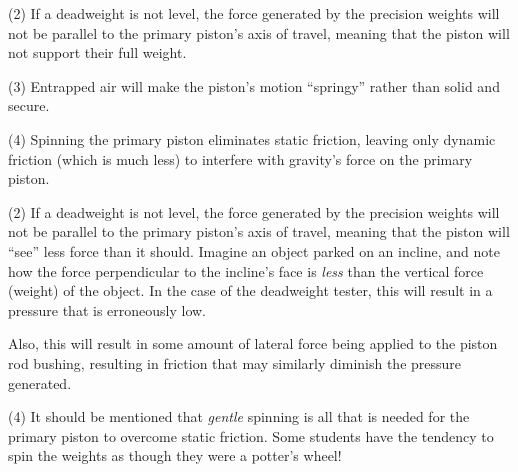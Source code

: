 \vskip 10pt {\narrower \noindent \baselineskip5pt

\noindent
(2) If a deadweight is not level, the force generated by the precision weights will not be parallel to the primary piston's axis of travel, meaning that the piston will not support their full weight.

\par} \vskip 10pt




\vskip 10pt {\narrower \noindent \baselineskip5pt

\noindent
(3) Entrapped air will make the piston's motion ``springy'' rather than solid and secure.

\par} \vskip 10pt




\vskip 10pt {\narrower \noindent \baselineskip5pt

\noindent
(4) Spinning the primary piston eliminates static friction, leaving only dynamic friction (which is much less) to interfere with gravity's force on the primary piston.

\par} \vskip 10pt










\vskip 10pt {\narrower \noindent \baselineskip5pt

\noindent
(2) If a deadweight is not level, the force generated by the precision weights will not be parallel to the primary piston's axis of travel, meaning that the piston will ``see'' less force than it should.  Imagine an object parked on an incline, and note how the force perpendicular to the incline's face is {\it less} than the vertical force (weight) of the object.  In the case of the deadweight tester, this will result in a pressure that is erroneously low.

\vskip 10pt

\noindent
Also, this will result in some amount of lateral force being applied to the piston rod bushing, resulting in friction that may similarly diminish the pressure generated.

\par} \vskip 10pt






\vskip 10pt {\narrower \noindent \baselineskip5pt

\noindent
(4) It should be mentioned that {\it gentle} spinning is all that is needed for the primary piston to overcome static friction.  Some students have the tendency to spin the weights as though they were a potter's wheel!

\par} \vskip 10pt




